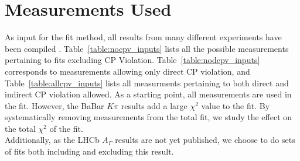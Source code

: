 \section{Measurements Used}
\label{sec:measurements}

As input for the fit method, all results from many different experiments have been compiled
\cite{HFAG,Abe:2007rd,delAmoSanchez:2010xz,Asner:2012xb,Aubert:2007wf,Zhang:2006dp,Aaltonen:2007ac}. 
Table~\ref{table:nocpv_inputs} lists all the possible
measurements pertaining to fits excluding CP Violation. Table~\ref{table:nodcpv_inputs}
corresponds to measurements allowing only direct CP violation, and 
Table~\ref{table:allcpv_inputs} lists all measurments pertaining to both
direct and indirect CP violation allowed. As a starting point, all measurements are used
in the fit. However, the BaBar $K\pi$ results add a large $\chi^2$ value to the fit. By systematically
removing measurements from the total fit, we study the effect on the total $\chi^2$ of the fit.\\

Additionally, as the LHCb $A_\Gamma$ results are not yet published, we choose to do sets of fits both
including and excluding this result. 
%



